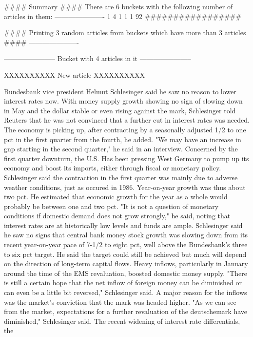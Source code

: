 \documentclass{article}
\begin{document}
\begin{pythonOutput}
#### Summary ####
There are 6 buckets with the following number of articles in them:
----------------------
1
4
1
1
1
92
#################

#### Printing 3 random articles from buckets which have more than 3 articles ####
----------------------

-----------------------
Bucket with 4 articles in it
-----------------------


XXXXXXXXXX
New article
XXXXXXXXXX

Bundesbank vice president Helmut
Schlesinger said he saw no reason to lower interest rates now.
    With money supply growth showing no sign of slowing down in
May and the dollar stable or even rising against the mark,
Schlesinger told Reuters that he was not convinced that a
further cut in interest rates was needed.
    The economy is picking up, after contracting by a
seasonally adjusted 1/2 to one pct in the first quarter from
the fourth, he added. "We may have an increase in gnp starting
in the second quarter," he said in an interview.
    Concerned by the first quarter downturn, the U.S. Has been
pressing West Germany to pump up its economy and boost its
imports, either through fiscal or monetary policy.
    Schlesinger said the contraction in the first quarter was
mainly due to adverse weather conditions, just as occured in
1986. Year-on-year growth was thus about two pct.
    He estimated that economic growth for the year as a whole
would probably be between one and two pct.
   "It is not a question of monetary conditions if domestic
demand does not grow strongly," he said, noting that interest
rates are at historically low levels and funds are ample.
    Schlesinger said he saw no signs that central bank money
stock growth was slowing down from its recent year-on-year pace
of 7-1/2 to eight pct, well above the Bundesbank's three to six
pct target.
    He said the target could still be achieved but much will
depend on the direction of long-term capital flows. Heavy
inflows, particularly in January around the time of the EMS
revaluation, boosted domestic money supply.
    "There is still a certain hope that the net inflow of
foreign money can be diminished or can even be a little bit
reversed," Schlesinger said.
    A major reason for the inflows was the market's conviction
that the mark was headed higher. "As we can see from the market,
expectations for a further revaluation of the deutschemark have
diminished," Schlesinger said.
    The recent widening of interest rate differentials, the

\end{pythonOutput}
\end{document}
